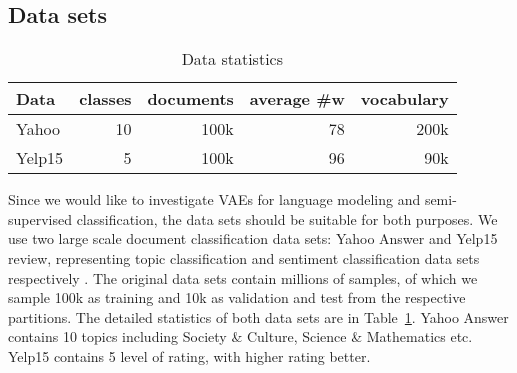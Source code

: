 \documentclass{article}
\begin{document}
\subsection{Data sets}
\begin{table}[!bp]
\small
  \centering
  \begin{tabular}{l r r r r}
    Data & classes & documents & average \#w & vocabulary \\
    \toprule
    Yahoo & 10 & 100k & 78 & 200k \\
    Yelp15 & 5 & 100k & 96 & 90k \\
  \end{tabular}
  \caption{Data statistics}
  \label{tab:data}
\end{table}
Since we would like to investigate VAEs for language modeling and
semi-supervised classification, the data sets should be suitable for
both purposes.
We use two large scale document classification data sets:
Yahoo Answer and Yelp15 review, representing topic classification
and sentiment classification data sets respectively
\cite{tang2015document,yang2016hierarchical,zhang2015character}.
The original data sets contain millions of samples, of which we sample
100k as training and 10k as validation and test from
the respective partitions. The detailed statistics of both data sets are in
Table~\ref{tab:data}. Yahoo Answer contains 10 topics including Society \&
Culture, Science \& Mathematics etc. Yelp15 contains 5 level of rating, with
higher rating better.
\end{document}
